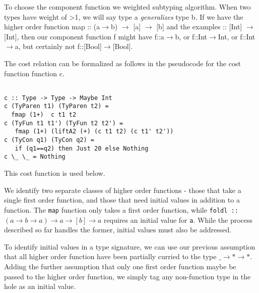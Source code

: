 


To choose the component function we weighted subtyping algorithm.
When two types have weight of >1, we will say type a \textit{generalizes} type b.
If we have the higher order function map :: (a$\to$b) $\to$ [a] $\to$ [b] and the examples :: [Int] $\to$ [Int], then our component function f might have f::a$\to$b, or f::Int$\to$Int, or f::Int$\to$a, but certainly not f::[Bool]$\to$[Bool].

The cost relation can be formalized as follows in the pseudocode for the cost function function c.
\begin{lstlisting}

c :: Type -> Type -> Maybe Int
c (TyParen t1) (TyParen t2) =
  fmap (1+)  c t1 t2
c (TyFun t1 t1') (TyFun t2 t2') =
   fmap (1+) (liftA2 (+) (c t1 t2) (c t1' t2'))
c (TyCon q1) (TyCon q2) =
   if (q1==q2) then Just 20 else Nothing
c \_ \_ = Nothing

\end{lstlisting}

This cost function is used below.

We identify two separate classes of higher order functions - those that take a single first order function, and those that need initial values in addition to a function. The \texttt{map} function only takes a first order function, while \texttt{foldl :: $(a\to b\to a)\to a\to [b]\to a$} requires an initial value for \texttt{a}. While the process described so far handles the former, initial values must also be addressed.

To identify initial values in a type signature, we can use our previous assumption that all higher order function have been partially curried to the type \texttt{$\_\to *\to*$}. Adding the further assumption that only one first order function maybe be passed to the higher order function, we simply tag any non-function type in the hole as an initial value. 

